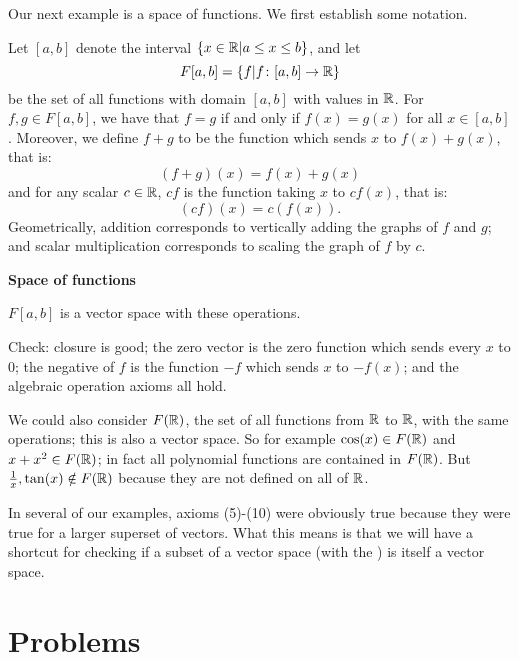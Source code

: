 


Our next example is a space of functions.  We first establish some
notation.

\begin{definition}
Let $[a,b]$ denote the interval $\{x \in \mathbb{R} | a \leq x \leq b\}$, and
let
$$
F[a,b] = \{ f | f \colon [a,b] \to \mathbb{R}\}
$$
be the set of all functions with domain $[a,b]$ with values in $\mathbb{R}$.
For $f,g \in F[a,b]$, we have that $f=g$ if and only if $f(x)=g(x)$
for all $x\in [a,b]$.  Moreover, we define $f+g$ to be the function
which sends $x$ to $f(x)+g(x)$, that is:
$$
(f+g)(x) = f(x) + g(x)
$$
and for any scalar $c \in \mathbb{R}$, $cf$ is the function taking $x$ to
$cf(x)$, that is:
$$
(cf)(x) = c(f(x)).
$$
Geometrically, addition corresponds to vertically adding the
graphs of $f$ and $g$; and scalar multiplication corresponds
to scaling the graph of $f$ by $c$.
\end{definition}

\begin{myexample} {\bf Space of functions}

$F[a,b]$ is a vector space with these operations.

Check:  closure is good; the zero vector is the zero function 
which sends every $x$ to $0$; the negative of $f$ is the
function $-f$ which sends $x$ to $-f(x)$; and the algebraic
operation axioms all hold.

\end{myexample}

\begin{myexample} We could also consider $F(\mathbb{R})$, the set of all functions
from $\mathbb{R}$ to $\mathbb{R}$, with the same operations; this is also a vector
space.    So for example $\cos(x) \in F(\mathbb{R})$ and $x+x^2 \in F(\mathbb{R})$;
in fact all polynomial functions are contained in $F(\mathbb{R})$.
But $\frac{1}{x}, \tan(x) \notin F(\mathbb{R})$ because they are not
defined on all of $\mathbb{R}$.   
\end{myexample}

In several of our examples, axioms (5)-(10) were obviously true
because they were true for a larger superset of vectors.  What
this means is that we will have a shortcut for checking if
a subset of a vector space (with the ) is itself
a vector space.



\section*{Problems}
%


